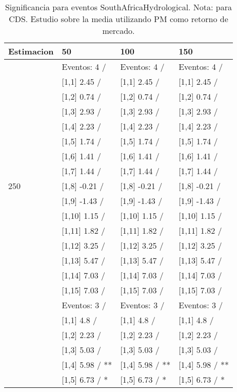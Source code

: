 \begin{table}

\caption{Significancia para eventos SouthAfricaHydrological. Nota: para CDS. Estudio sobre la media utilizando PM como retorno de mercado.}
\centering
\begin{tabular}[t]{llll}
\toprule
Estimacion & 50 & 100 & 150\\
\midrule
 & Eventos:  4 / & Eventos:  4 / & Eventos:  4 /\\
 & {}[1,1] 2.45  / & {}[1,1] 2.45  / & {}[1,1] 2.45  /\\
 & {}[1,2] 0.74  / & {}[1,2] 0.74  / & {}[1,2] 0.74  /\\
 & {}[1,3] 2.93  / & {}[1,3] 2.93  / & {}[1,3] 2.93  /\\
 & {}[1,4] 2.23  / & {}[1,4] 2.23  / & {}[1,4] 2.23  /\\
\addlinespace
 & {}[1,5] 1.74  / & {}[1,5] 1.74  / & {}[1,5] 1.74  /\\
 & {}[1,6] 1.41  / & {}[1,6] 1.41  / & {}[1,6] 1.41  /\\
 & {}[1,7] 1.44  / & {}[1,7] 1.44  / & {}[1,7] 1.44  /\\
250 & {}[1,8] -0.21  / & {}[1,8] -0.21  / & {}[1,8] -0.21  /\\
 & {}[1,9] -1.43  / & {}[1,9] -1.43  / & {}[1,9] -1.43  /\\
\addlinespace
 & {}[1,10] 1.15  / & {}[1,10] 1.15  / & {}[1,10] 1.15  /\\
 & {}[1,11] 1.82  / & {}[1,11] 1.82  / & {}[1,11] 1.82  /\\
 & {}[1,12] 3.25  / & {}[1,12] 3.25  / & {}[1,12] 3.25  /\\
 & {}[1,13] 5.47  / & {}[1,13] 5.47  / & {}[1,13] 5.47  /\\
 & {}[1,14] 7.03  / & {}[1,14] 7.03  / & {}[1,14] 7.03  /\\
\addlinespace
 & {}[1,15] 7.03  / & {}[1,15] 7.03  / & {}[1,15] 7.03  /\\
 & Eventos:  3 / & Eventos:  3 / & Eventos:  3 /\\
 & {}[1,1] 4.8  / & {}[1,1] 4.8  / & {}[1,1] 4.8  /\\
 & {}[1,2] 2.23  / & {}[1,2] 2.23  / & {}[1,2] 2.23  /\\
 & {}[1,3] 5.03  / & {}[1,3] 5.03  / & {}[1,3] 5.03  /\\
\addlinespace
 & {}[1,4] 5.98  / ** & {}[1,4] 5.98  / ** & {}[1,4] 5.98  / **\\
 & {}[1,5] 6.73  / * & {}[1,5] 6.73  / * & {}[1,5] 6.73  / *\\

\end{tabular}
\end{table}
